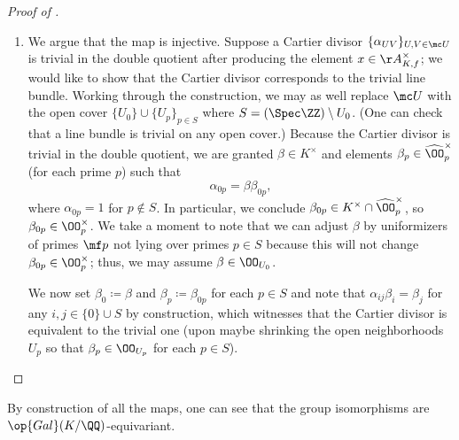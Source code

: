 \documentclass[../notes.tex]{subfiles}
\begin{document}
\begin{proof}[Proof of ]
\begin{enumerate}
		We are now ready to construct our Cartier divisor. The index set for our open cover will be $I\coloneqq\{0\}\cup S$, where $U_0=(\Spec\ZZ)\setminus S$, and $U_p$ is an open neighborhood of $p$ chosen small enough so that $x_p\in\OO_{U_0}^\times$. Now, we define $x_0\coloneqq1$ and define
		\[\alpha_{ij}\coloneqq x_jx_i^{-1}\]
		for any $i,j\in S$. Then the tuple $\{\alpha_{ij}\}_{i,j\in I}$ satisfies the cocycle condition and maps to $x$ by construction, so we are done.

		\item We argue that the map is injective. Suppose a Cartier divisor $\{\alpha_{UV}\}_{U,V\in\mc U}$ is trivial in the double quotient after producing the element $x\in\AA_{K,f}^\times$; we would like to show that the Cartier divisor corresponds to the trivial line bundle. Working through the construction, we may as well replace $\mc U$ with the open cover $\{U_0\}\cup\{U_p\}_{p\in S}$ where $S=(\Spec\ZZ)\setminus U_0$. (One can check that a line bundle is trivial on any open cover.) Because the Cartier divisor is trivial in the double quotient, we are granted $\beta\in K^\times$ and elements $\beta_p\in\widehat\OO_p^\times$ (for each prime $p$) such that
		\[\alpha_{0p}=\beta\beta_{0p},\]
		where $\alpha_{0p}=1$ for $p\notin S$. In particular, we conclude $\beta_{0p}\in K^\times\cap\widehat\OO_{p}^\times$, so $\beta_{0p}\in \OO_p^\times$. We take a moment to note that we can adjust $\beta$ by uniformizers of primes $\mf p$ not lying over primes $p\in S$ because this will not change $\beta_{0p}\in\OO_p^\times$; thus, we may assume $\beta\in\OO_{U_0}$.
		
		We now set $\beta_0\coloneqq\beta$ and $\beta_p\coloneqq\beta_{0p}$ for each $p\in S$ and note that $\alpha_{ij}\beta_i=\beta_j$ for any $i,j\in\{0\}\cup S$ by construction, which witnesses that the Cartier divisor is equivalent to the trivial one (upon maybe shrinking the open neighborhoods $U_p$ so that $\beta_p\in\OO_{U_p}$ for each $p\in S$).
		\qedhere
	\end{enumerate}
\end{proof}
\begin{remark} \label{rem:galois-invariant-better-cl-group}
	By construction of all the maps, one can see that the group isomorphisms are $\op{Gal}(K/\QQ)$-equivariant.
\end{remark}
\end{document}
